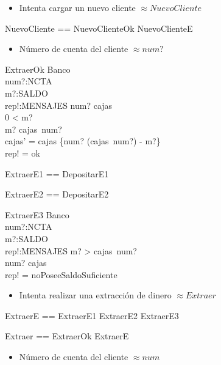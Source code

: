 \begin{itemize}
  \item Intenta cargar un nuevo cliente $\approx NuevoCliente$ 
\end{itemize}

\begin{zed}
NuevoCliente == NuevoClienteOk \lor NuevoClienteE
\end{zed}

\begin{itemize}
  \item Número de cuenta del cliente $\approx num?$ 
\end{itemize}

\begin{schema}{ExtraerOk}
\Delta Banco \\
num?:NCTA \\
m?:SALDO \\
rep!:MENSAJES
\where
num? \in \dom cajas \\
0 < m? \\
m? \leq cajas~num? \\
cajas' = cajas \oplus \{num? \mapsto (cajas~num?) - m?\} \\
rep! = ok
\end{schema}

\begin{zed}
ExtraerE1 == DepositarE1 \also

ExtraerE2 == DepositarE2
\end{zed}

\begin{schema}{ExtraerE3}
\Xi Banco \\
num?:NCTA \\
m?:SALDO \\
rep!:MENSAJES
\where
m? > cajas~num? \\
num? \in \dom cajas \\
rep! = noPoseeSaldoSuficiente
\end{schema}

\begin{itemize}
  \item Intenta realizar una extracción de dinero $\approx Extraer$ 
\end{itemize}

\begin{zed}
ExtraerE == ExtraerE1 \lor ExtraerE2 \lor ExtraerE3 \also

Extraer == ExtraerOk \lor ExtraerE
\end{zed}

\begin{itemize}
  \item Número de cuenta del cliente $\approx num$ 
\end{itemize}

